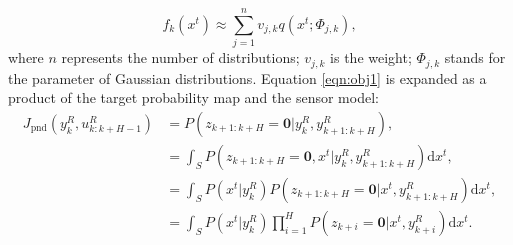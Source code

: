 \documentclass[twocolumn,10pt]{asme2e}
\newcommand{\todonote}[1]{\vspace{0px} %
\todo[inline, color=green!30]{\textbf{[Note:]} {#1}} %
}
\begin{document}
\begin{equation}\label{eqn:gmm_prob_map_exp_fam}
f_{k}(x^t)\approx\sum\limits_{j=1}^{n}v_{j,k}q(x^t;\Phi_{j,k}),
\end{equation}
where $n$ represents the number of distributions; $v_{j,k}$ is the weight; $\Phi_{j,k}$ stands for the parameter of Gaussian distributions.
Equation \cref{eqn:obj1} is expanded as a product of the target probability map and the sensor model:
\begin{subequations}
\begin{align}
J_\text{pnd}(y^R_k,u^R_{k:k+H-1})&=P(z_{k+1:k+H}=\mathbf{0}|y^R_k,y^R_{k+1:k+H}),\label{eqn:obj_def2}\\
&=\int_S P(z_{k+1:k+H}=\mathbf{0},x^t|y^R_{k},y^R_{k+1:k+H})\mathrm{d}x^t,\label{eqn:obj_ltp}\\ %
&=\int_S P(x^t|y^R_{k})P(z_{k+1:k+H}=\mathbf{0}|x^t,y^R_{k+1:k+H})\mathrm{d}x^t,\label{eqn:obj_ci}\\%
&=\int_S P(x^t|y^R_{k})\prod\limits_{i=1}^H P(z_{k+i}=\mathbf{0}|x^t,y^R_{k+i})\mathrm{d}x^t.\label{eqn:obj_int} %
\end{align}
\end{subequations}
\end{document}

